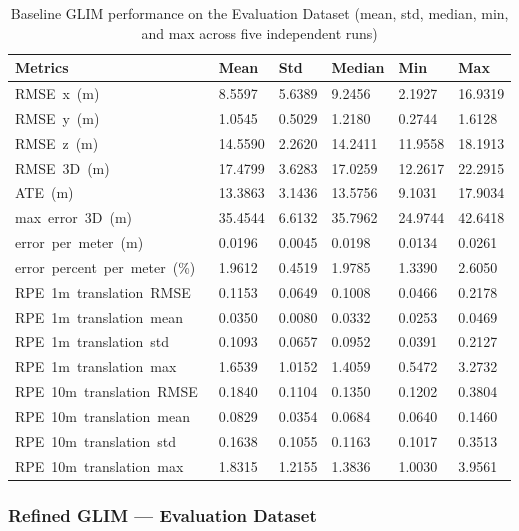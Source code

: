 \begin{table}[htbp]
\centering
\caption{Baseline GLIM performance on the Evaluation Dataset (mean, std, median, min, and max across five independent runs)}
\label{tab:eval_baseline_performance}
\begin{tabularx}{\textwidth}{lXXXXX}
\toprule
\textbf{Metrics} & \textbf{Mean} & \textbf{Std} & \textbf{Median} & \textbf{Min} & \textbf{Max} \\ \midrule
RMSE\ x\ (m)\        & 8.5597  & 5.6389 & 9.2456  & 2.1927  & 16.9319 \\
RMSE\ y\ (m)\        & 1.0545  & 0.5029 & 1.2180  & 0.2744  & 1.6128  \\
RMSE\ z\ (m)\        & 14.5590 & 2.2620 & 14.2411 & 11.9558 & 18.1913 \\
RMSE\ 3D\ (m)\       & 17.4799 & 3.6283 & 17.0259 & 12.2617 & 22.2915 \\
ATE\ (m)\            & 13.3863 & 3.1436 & 13.5756 & 9.1031  & 17.9034 \\
max\ error\ 3D\ (m)\ & 35.4544 & 6.6132 & 35.7962 & 24.9744 & 42.6418 \\
error\ per\ meter\ (m)\        & 0.0196  & 0.0045 & 0.0198  & 0.0134  & 0.0261  \\
error\ percent\ per\ meter\ (\%)\ & 1.9612  & 0.4519 & 1.9785  & 1.3390  & 2.6050  \\
RPE\ 1m\ translation\ RMSE\  & 0.1153 & 0.0649 & 0.1008 & 0.0466 & 0.2178 \\
RPE\ 1m\ translation\ mean\  & 0.0350 & 0.0080 & 0.0332 & 0.0253 & 0.0469 \\
RPE\ 1m\ translation\ std\   & 0.1093 & 0.0657 & 0.0952 & 0.0391 & 0.2127 \\
RPE\ 1m\ translation\ max\   & 1.6539 & 1.0152 & 1.4059 & 0.5472 & 3.2732 \\
RPE\ 10m\ translation\ RMSE\ & 0.1840 & 0.1104 & 0.1350 & 0.1202 & 0.3804 \\
RPE\ 10m\ translation\ mean\ & 0.0829 & 0.0354 & 0.0684 & 0.0640 & 0.1460 \\
RPE\ 10m\ translation\ std\  & 0.1638 & 0.1055 & 0.1163 & 0.1017 & 0.3513 \\
RPE\ 10m\ translation\ max\  & 1.8315 & 1.2155 & 1.3836 & 1.0030 & 3.9561 \\ \bottomrule
\end{tabularx}
\end{table}

\subsubsection{Refined GLIM --- Evaluation Dataset}

